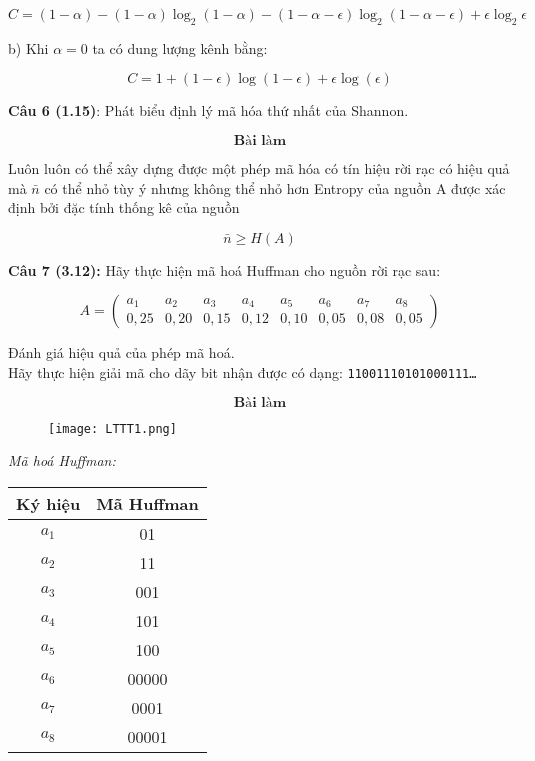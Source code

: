 \documentclass[12pt]{article}
\begin{document}

\[
C = (1 - \alpha) - (1 - \alpha) \log_2(1 - \alpha) - (1 - \alpha - \epsilon) \log_2(1 - \alpha - \epsilon) + \epsilon \log_2 \epsilon
\]


b) Khi $\alpha=0$ ta có dung lượng kênh bằng:

\[
C=1+(1-\epsilon)\log(1-\epsilon)+\epsilon\log(\epsilon)
\]

\newpage
\textbf{Câu 6 (1.15)}: Phát biểu định lý mã hóa thứ nhất của Shannon.

\[
\textbf{Bài làm}
\]

Luôn luôn có thể xây dựng được một phép mã hóa có tín hiệu rời rạc có hiệu quả mà $\bar{n}$ có thể nhỏ tùy ý nhưng không thể nhỏ hơn Entropy của nguồn A được xác định bởi đặc tính thống kê của nguồn 

\[
\bar{n} \geq H(A)
\]

\newpage
\textbf{Câu 7 (3.12):} Hãy thực hiện mã hoá Huffman cho nguồn rời rạc sau: 

\[
A = \left(
\begin{array}{cccccccc}
a_1 & a_2 & a_3 & a_4 & a_5 & a_6 & a_7 & a_8 \\
0{,}25 & 0{,}20 & 0{,}15 & 0{,}12 & 0{,}10 & 0{,}05 & 0{,}08 & 0{,}05
\end{array}
\right)
\]

Đánh giá hiệu quả của phép mã hoá.\\

Hãy thực hiện giải mã cho dãy bit nhận được có dạng: 
\texttt{11001110101000111…}

\[
\textbf{Bài làm}
\]

\begin{figure}[h]
    \centering
    \texttt{[image: LTTT1.png]}
    \label{fig:enter-label}
\end{figure}

\textit{Mã hoá Huffman:}

\begin{center}
\begin{tabular}{|c|c|}
\hline
Ký hiệu & Mã Huffman \\
\hline
$a_1$ & 01 \\
$a_2$ & 11 \\
$a_3$ & 001 \\
$a_4$ & 101 \\
$a_5$ & 100 \\
$a_6$ & 00000 \\
$a_7$ & 0001 \\
$a_8$ & 00001 \\
\hline
\end{tabular}
\end{center}
\end{document}
